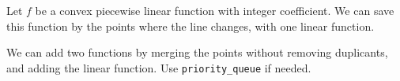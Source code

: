 Let $f$ be a convex piecewise linear function with integer coefficient.
We can save this function by the points where the line changes, with one linear function.

We can add two functions by merging the points without removing duplicants, and adding the linear function.
Use \texttt{priority\_queue} if needed.